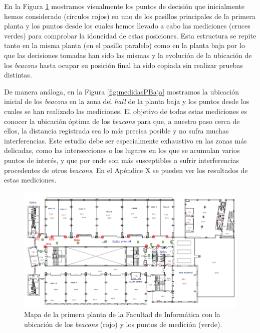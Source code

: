 En la Figura \ref{fig:medidasPPrimera} mostramos visualmente los puntos de decisión que inicialmente hemos considerado (círculos rojos) en uno de los pasillos principales de la primera planta y los puntos desde los cuales hemos llevado a cabo las mediciones (cruces verdes) para comprobar la idoneidad de estas posiciones. Esta estructura se repite tanto en la misma planta (en el pasillo paralelo) como en la planta baja por lo que las decisiones tomadas han sido las mismas y la evolución de la ubicación de los \textit{beacons} hasta ocupar su posición final ha sido copiada sin realizar pruebas distintas.

De manera análoga, en la Figura \ref{fig:medidasPBaja} mostramos la ubicación inicial de los \textit{beacons} en la zona del \textit{hall} de la planta baja y los puntos desde los cuales se han realizado las mediciones. El objetivo de todas estas mediciones es conocer la ubicación óptima de los \textit{beacons} para que, a nuestro paso cerca de ellos, la distancia registrada sea lo más precisa posible y no sufra muchas interferencias. Este estudio debe ser especialmente exhaustivo en las zonas más delicadas, como las intersecciones o los lugares en los que se acumulan varios puntos de interés, y que por ende son más susceptibles a sufrir interferencias procedentes de otros \textit{beacons}. En el Apéndice X se pueden ver los resultados de estas mediciones. 


\begin{figure}[t]
	\centering
	\includegraphics[width=1\textwidth]{Imagenes/Descripciondeltrabajo/mapa_mediciones_planta1}
	\caption{Mapa de la primera planta de la Facultad de Informática con la ubicación de los \textit{beacons} (rojo) y los puntos de medición (verde). }
	\label{fig:medidasPPrimera}
\end{figure}

